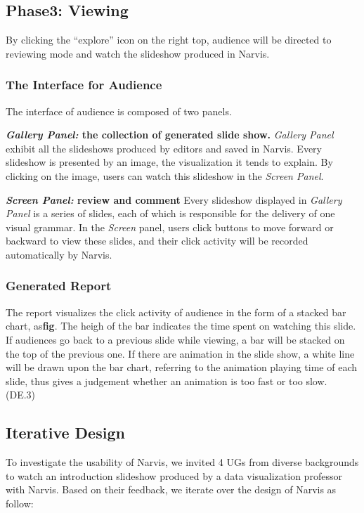 \subsection{Phase3: Viewing}
By clicking the ``explore'' icon on the right top, audience will be directed to reviewing mode and watch the slideshow produced in Narvis.
\subsubsection{The Interface for Audience}
The interface of audience is composed of two panels.

\noindent
\textbf{\textit{Gallery Panel:} the collection of generated slide show.} 
\textit{Gallery Panel} exhibit all the slideshows produced by editors and saved in Narvis. Every slideshow  is presented by an image, the visualization it tends to explain. By clicking on the image, users can watch this slideshow in the \textit{Screen Panel}. 

\noindent
\textbf{\textit{Screen Panel:}  review and comment}
Every slideshow displayed in \textit{Gallery Panel} is a series of slides, each of which is responsible for the delivery of one visual grammar. In the \textit{Screen} panel, users click buttons to move forward or backward to view these slides, and their click activity will be recorded automatically by Narvis. 

\subsubsection{Generated Report}
The report visualizes the click activity of audience in the form of a stacked bar chart, as\textbf{fig}. The heigh of the bar indicates the time spent on watching this slide. If audiences go back to a previous slide while viewing, a bar will be stacked on the top of the previous one. If there are animation in the slide show, a white line will be drawn upon the bar chart, referring to the animation playing time of each slide, thus gives a judgement whether an animation is too fast or too slow. (DE.3)

\subsection{Iterative Design}
To investigate the usability of Narvis, we invited 4 UGs  from diverse backgrounds to watch an introduction slideshow produced by a data visualization professor with Narvis. 
Based on their feedback, we iterate over the design of Narvis as follow:

